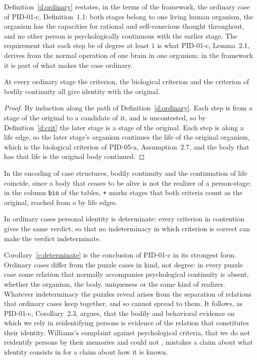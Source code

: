 \documentclass{situationist-preprint}
\begin{document}
Definition~\ref{d:ordinary} restates, in the terms of the framework, the ordinary case of PID-01-c, Definition~1.1: both stages belong to one living human organism, the organism has the capacities for rational and self-conscious thought throughout, and no other person is psychologically continuous with the earlier stage. The requirement that each step be of degree at least $1$ is what PID-01-c, Lemma~2.1, derives from the normal operation of one brain in one organism; in the framework it is part of what makes the case ordinary.

\begin{theorem}\label{t:ordinary}
At every ordinary stage the criterion, the biological criterion and the criterion of bodily continuity all give identity with the original.
\end{theorem}

\begin{proof}
By induction along the path of Definition~\ref{d:ordinary}. Each step is from a stage of the original to a candidate of it, and is uncontested, so by Definition~\ref{d:crit} the later stage is a stage of the original. Each step is along a life edge, so the later stage's organism continues the life of the original organism, which is the biological criterion of PID-05-a, Assumption~2.7, and the body that has that life is the original body continued.
\end{proof}

In the encoding of case structures, bodily continuity and the continuation of life coincide, since a body that ceases to be alive is not the realizer of a person-stage; in the column \texttt{bio} of the tables, \texttt{+} marks stages that both criteria count as the original, reached from $o$ by life edges.

\begin{corollary}[Determinacy]\label{c:determinate}
In ordinary cases personal identity is determinate: every criterion in contention gives the same verdict, so that no indeterminacy in which criterion is correct can make the verdict indeterminate.
\end{corollary}

Corollary~\ref{c:determinate} is the conclusion of PID-01-c in its strongest form. Ordinary cases differ from the puzzle cases in kind, not degree: in every puzzle case some relation that normally accompanies psychological continuity is absent, whether the organism, the body, uniqueness or the same kind of realizer. Whatever indeterminacy the puzzles reveal arises from the separation of relations that ordinary cases keep together, and so cannot spread to them. It follows, as PID-01-c, Corollary~2.3, argues, that the bodily and behavioral evidence on which we rely in reidentifying persons is evidence of the relation that constitutes their identity. Williams's complaint against psychological criteria, that we do not reidentify persons by their memories and could not \citep{Williams1957}, mistakes a claim about what identity consists in for a claim about how it is known.
\end{document}
